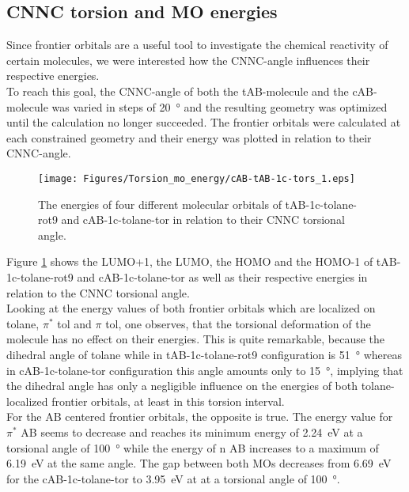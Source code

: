 \subsection{CNNC torsion and MO energies}
Since frontier orbitals are a useful tool to investigate the chemical reactivity of certain molecules, we were interested how the CNNC-angle influences their respective energies. \\
To reach this goal, the CNNC-angle of both the tAB-molecule and the cAB-molecule was varied in steps of \SI{20}{\degree} and the resulting geometry was optimized until the calculation no longer succeeded. The frontier orbitals were calculated at each constrained geometry and their energy was plotted in relation to their CNNC-angle.\\
%
\begin{figure}[H]
    \centering
    \texttt{[image: Figures/Torsion\_mo\_energy/cAB-tAB-1c-tors\_1.eps]}
    \caption{The energies of four different molecular orbitals of tAB-1c-tolane-rot9 and cAB-1c-tolane-tor in relation to their CNNC torsional angle.}
    \label{fig:MO_tors_1c_AB}
\end{figure}
%
Figure \ref{fig:MO_tors_1c_AB} shows the LUMO+1, the LUMO, the HOMO and the HOMO-1 of tAB-1c-tolane-rot9 and cAB-1c-tolane-tor as well as their respective energies in relation to the CNNC torsional angle. \\ 
Looking at the energy values of both frontier orbitals which are localized on tolane, $\pi^*$ tol and $\pi$ tol, one observes, that the torsional deformation of the molecule has no effect on their energies. This is quite remarkable, because the dihedral angle of tolane while in tAB-1c-tolane-rot9 configuration is \SI{51}{\degree} whereas in cAB-1c-tolane-tor configuration this angle amounts only to \SI{15}{\degree}, implying that the dihedral angle has only a negligible influence on the energies of both tolane-localized frontier orbitals, at least in this torsion interval.\\
For the AB centered frontier orbitals, the opposite is true. The energy value for $\pi^*$ AB seems to decrease and reaches its minimum energy of \SI{2.24}{\eV} at a torsional angle of \SI{100}{\degree} while the energy of n AB increases to a maximum of \SI{6.19}{\eV} at the same angle. The gap between both MOs decreases from \SI{6.69}{\eV} for the cAB-1c-tolane-tor to \SI{3.95}{\eV} at at a torsional angle of \SI{100}{\degree}. 
